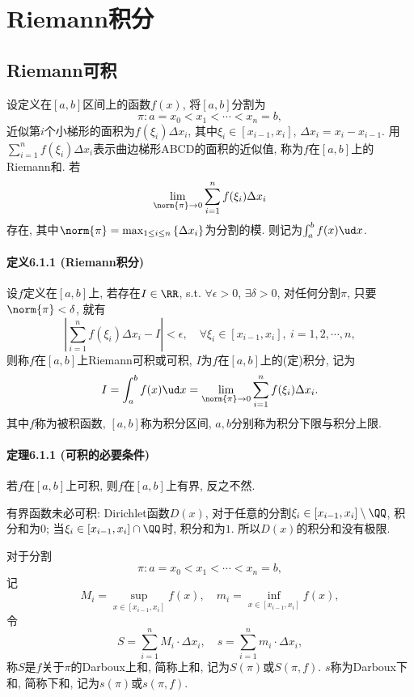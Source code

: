 
\section{Riemann积分}

\subsection{Riemann可积}

设定义在$[a,b]$区间上的函数$f(x)$, 将$[a,b]$分割为
\[
\pi:a=x_{0}<x_{1}<\cdots<x_{n}=b,
\]
近似第$i$个小梯形的面积为$f(\xi_{i})\Delta x_{i}$, 其中$\xi_{i}\in[x_{i-1},x_{i}]$,
$\Delta x_{i}=x_{i}-x_{i-1}$. 用$\sum_{i=1}^{n}f(\xi_{i})\Delta x_{i}$表示曲边梯形ABCD的面积的近似值,
称为$f$在$[a,b]$上的Riemann和. 若
\[
\lim_{\norm{\pi}\to0}\sum_{i=1}^{n}f(\xi_{i})\Delta x_{i}
\]
存在, 其中$\norm{\pi}=\max_{1\le i\le n}\left\{ \Delta x_{i}\right\} $为分割的模.
则记为$\int_{a}^{b}f(x)\ud x$.

\paragraph{定义6.1.1 (Riemann积分)}

设$f$定义在$[a,b]$上, 若存在$I\in\RR$, s.t. $\forall\epsilon>0$, $\exists\delta>0$,
对任何分割$\pi$, 只要$\norm{\pi}<\delta$, 就有
\[
\left|\sum_{i=1}^{n}f(\xi_{i})\Delta x_{i}-I\right|<\epsilon,\quad\forall\xi_{i}\in[x_{i-1},x_{i}],\ i=1,2,\cdots,n,
\]
则称$f$在$[a,b]$上Riemann可积或可积, $I$为$f$在$[a,b]$上的(定)积分, 记为
\[
I=\int_{a}^{b}f(x)\ud x=\lim_{\norm{\pi}\to0}\sum_{i=1}^{n}f(\xi_{i})\Delta x_{i}.
\]
其中$f$称为被积函数, $[a,b]$称为积分区间, $a,b$分别称为积分下限与积分上限.

\paragraph{定理6.1.1 (可积的必要条件)}

若$f$在$[a,b]$上可积, 则$f$在$[a,b]$上有界, 反之不然.

有界函数未必可积: Dirichlet函数$D(x)$, 对于任意的分割$\xi_{i}\in[x_{i-1},x_{i}]\setminus\QQ$,
积分和为$0$; 当$\xi_{i}\in[x_{i-1},x_{i}]\cap\QQ$时, 积分和为$1$. 所以$D(x)$的积分和没有极限.

对于分割
\[
\pi:a=x_{0}<x_{1}<\cdots<x_{n}=b,
\]
记
\[
M_{i}=\sup_{x\in[x_{i-1},x_{i}]}f(x),\quad m_{i}=\inf_{x\in[x_{i-1},x_{i}]}f(x),
\]
令
\[
S=\sum_{i=1}^{n}M_{i}\cdot\Delta x_{i},\quad s=\sum_{i=1}^{n}m_{i}\cdot\Delta x_{i},
\]
称$S$是$f$关于$\pi$的Darboux上和, 简称上和, 记为$S(\pi)$或$S(\pi,f)$. $s$称为Darboux下和,
简称下和, 记为$s(\pi)$或$s(\pi,f)$. 

